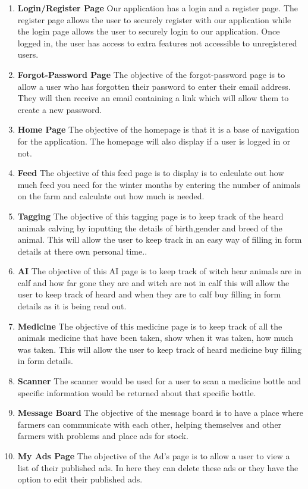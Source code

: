 \documentclass[12pt,a4paper,oneside,openany]{book}
\begin{document}
\begin{enumerate}
    \item \textbf{Login/Register Page} Our application has a login and a register page. The register page allows the user to securely register with our application while the login page allows the user to securely login to our application. Once logged in, the user has access to extra features not accessible to unregistered users.
    
    \item \textbf{Forgot-Password Page}
    The objective of the forgot-password page is to allow a user who has forgotten their password to enter their email address. They will then receive an email containing a link which will allow them to create a new password.

    \item \textbf{Home Page} 
    The objective of the homepage is that it is a base of navigation for the application. The homepage will also display if a user is logged in or not.
    
    \item \textbf{Feed} 
    The objective of this feed page is to display is to calculate out how much feed you need for the winter months by entering the number of animals on the farm and calculate out how much is needed.
    
    \item \textbf{Tagging} 
    The objective of this tagging page is to keep track of the heard animals calving by inputting the details of birth,gender and breed of the animal. This will allow the user to keep track in an easy way of filling in form details at there own personal time..
    
     \item \textbf{AI}
    The objective of this AI page is to keep track of witch hear animals are in calf and how far gone they are and witch are not in calf this will allow the user to keep track of heard and when they are to calf buy filling in form details as it is being read out.
     
     \item \textbf{Medicine}
     The objective of this medicine page is to keep track of all the animals medicine that have been taken, show when it was taken, how much was taken. This will allow the user to keep track of heard medicine buy filling in form details.
     
     \item \textbf{Scanner}
     The scanner would be used for a user to scan a medicine bottle and specific information would be returned about that specific bottle.
     
    \item \textbf{Message Board} 
    The objective of the message board is to have a place where farmers can communicate with each other, helping themselves and other farmers with problems and place ads for stock.
    
    \item \textbf{My Ads Page}
    The objective of the Ad’s page is to allow a user to view a list of their published ads. In here they can delete these ads or they have the option to edit their published ads.
\end{enumerate}
\end{document}
